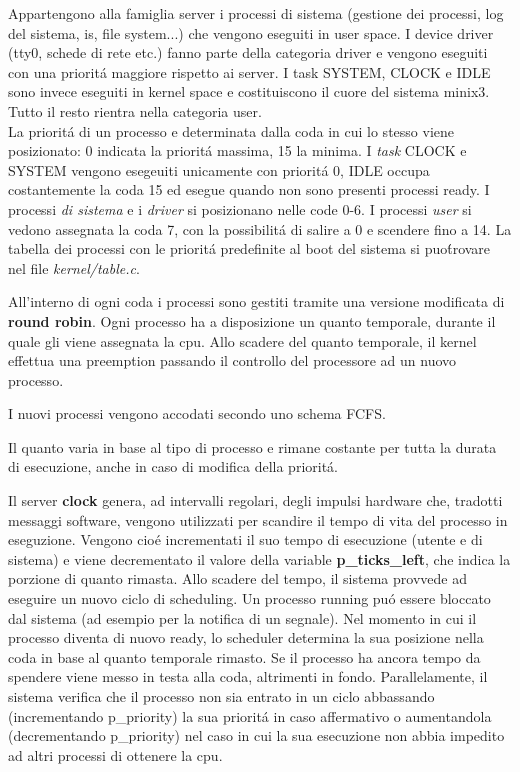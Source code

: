 \documentclass[a4paper,12pt]{report}
\begin{document}
Appartengono alla famiglia server i processi di sistema (gestione dei
processi, log del sistema, is, file system...)  che vengono eseguiti in
user space. I device driver (tty0, schede di rete etc.) fanno parte della
categoria driver e vengono eseguiti con una priorit\'a maggiore rispetto ai
server.
I task SYSTEM, CLOCK e IDLE sono invece eseguiti in kernel space e
costituiscono il cuore del sistema minix3.
Tutto il resto rientra nella categoria user.
\\
La priorit\'a di un processo e determinata dalla coda in cui lo stesso viene posizionato:
0 indicata la priorit\'a massima, 15 la minima.
I \textit{task} CLOCK e SYSTEM vengono esegeuiti unicamente con priorit\'a
0, IDLE occupa costantemente la coda 15 ed esegue quando non sono presenti
processi ready.
I processi \textit{di sistema} e i \textit{driver} si posizionano nelle code 0-6.
I processi \textit{user} si vedono assegnata la coda 7, con la possibilit\'a di
salire a 0 e scendere fino a 14.
La tabella dei processi con le priorit\'a predefinite al boot del sistema 
si puo\' trovare nel file \textit{kernel/table.c}.

All'interno di ogni coda i processi sono gestiti tramite una versione modificata di \textbf{round robin}. 
Ogni processo ha a disposizione un quanto temporale, durante il quale
gli viene assegnata la cpu.
Allo scadere del quanto temporale, il kernel effettua una preemption
passando il controllo del processore ad un nuovo processo.

I nuovi processi vengono accodati secondo uno schema FCFS.

Il quanto varia in base al tipo di processo e rimane costante per tutta la durata
di esecuzione, anche in caso di modifica della priorit\'a.

Il server \textbf{clock} genera, ad intervalli regolari, degli impulsi hardware 
che, tradotti messaggi software, vengono utilizzati per scandire il tempo di vita del processo
in eseguzione. Vengono cio\'e incrementati il suo tempo di esecuzione (utente e di sistema)
e viene decrementato il valore della variable \textbf{p\_ticks\_left}, che indica la porzione di quanto
rimasta. Allo scadere del tempo, il sistema provvede ad eseguire un nuovo
ciclo di scheduling.
Un processo running pu\'o essere bloccato dal sistema (ad esempio per la
notifica di un segnale). Nel momento in cui il processo diventa di nuovo
ready, lo scheduler determina la sua posizione nella coda in base al quanto 
temporale rimasto. Se il processo ha ancora tempo da spendere viene messo in
testa alla coda, altrimenti in fondo. Parallelamente, il sistema verifica
che il processo non sia entrato in un ciclo abbassando (incrementando
p\_priority) la sua priorit\'a in caso affermativo o aumentandola (decrementando p\_priority) 
nel caso in cui la sua esecuzione non abbia impedito ad altri processi di ottenere la cpu.
\end{document}
